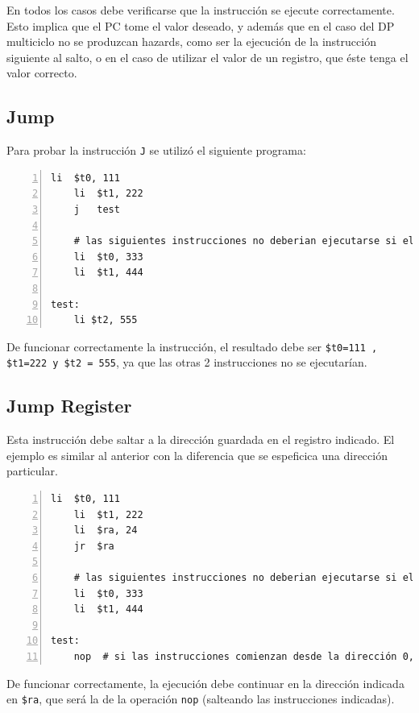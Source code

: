 \documentclass[11pt,a4paper, spanish]{article}
\begin{document}
En todos los casos debe verificarse que la instrucción se ejecute correctamente. Esto implica
que el PC tome el valor deseado, y además que en el caso del DP multiciclo no se produzcan
hazards, como ser la ejecución de la instrucción siguiente al salto, o en el caso de utilizar el valor
de un registro, que éste tenga el valor correcto.


\subsection{Jump}

Para probar la instrucción \texttt{J} se utilizó el siguiente programa:

\begin{lstlisting}[numbers=left, tabsize=2, basicstyle=\fontsize{11}{13}\ttfamily, frame=single, caption={Test j}]
	li	$t0, 111
	li	$t1, 222
	j	test

	# las siguientes instrucciones no deberian ejecutarse si el salto se realiza
	li	$t0, 333
	li	$t1, 444

test:
	li $t2, 555
\end{lstlisting}

De funcionar correctamente la instrucción, el resultado debe ser \texttt{\$t0=111 , \$t1=222 y \$t2 = 555}, ya que las otras 2 instrucciones no se ejecutarían.


\subsection{Jump Register}

Esta instrucción debe saltar a la dirección guardada en el registro indicado. El ejemplo es similar al
anterior con la diferencia que se espeficica una dirección particular.

\begin{lstlisting}[numbers=left, tabsize=2, basicstyle=\fontsize{11}{13}\ttfamily, frame=single, caption={Test jr}]
	li	$t0, 111
	li	$t1, 222
	li	$ra, 24
	jr	$ra

	# las siguientes instrucciones no deberian ejecutarse si el salto se realiza
	li	$t0, 333
	li	$t1, 444

test:
	nop  # si las instrucciones comienzan desde la dirección 0, esta tiene la dirección 24
\end{lstlisting}

De funcionar correctamente, la ejecución debe continuar en la dirección indicada en \texttt{\$ra}, que
será la de la operación \texttt{nop} (salteando las instrucciones indicadas).
\end{document}
